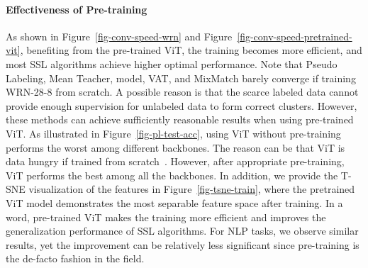 \documentclass{article}
\begin{document}
\paragraph{Effectiveness of Pre-training}
\label{sec-ablation-pretrain}
As shown in Figure~\ref{fig-conv-speed-wrn} and Figure~\ref{fig-conv-speed-pretrained-vit}, benefiting from the pre-trained ViT, the training becomes more efficient, and most SSL algorithms achieve higher optimal performance. 
Note that Pseudo Labeling, Mean Teacher,  model, VAT, and MixMatch barely converge if training WRN-28-8 from scratch. A possible reason is that the scarce labeled data cannot provide enough supervision for unlabeled data to form correct clusters. However, these methods can achieve sufficiently reasonable results when using pre-trained ViT. As illustrated in Figure~\ref{fig-pl-test-acc}, using ViT without pre-training performs the worst among different backbones. The reason can be that ViT is data hungry if trained from scratch~\cite{dosovitskiy2020image,han2022survey,touvron2021training}. However, after appropriate pre-training, ViT performs the best among all the backbones. In addition, we provide the T-SNE visualization of the features in Figure~\ref{fig-tsne-train}, where the pretrained ViT model demonstrates the most separable feature space after training.
In a word, pre-trained ViT makes the training more efficient and improves the generalization performance of SSL algorithms. For NLP tasks, we observe similar results, yet the improvement can be relatively less significant since pre-training is the de-facto fashion in the field.







\begin{table}[t!]
\centering
\caption{Final ranks of SSL algorithms. Note that the rank for CV tasks here is different from the ones in Table~\ref{tab-cv-results} because we ignore MixMatch and ReMixMatch here to remove the effects of their missing ranks in NLP and Audio.}
\label{tab-rank-comparison}
\end{table}
\end{document}
